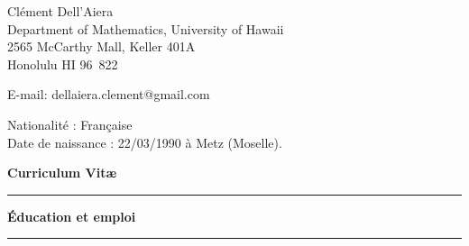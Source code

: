 \documentclass[a4paper,11pt]{article}
\newcommand{\titre}[1]{%
	\begin{center}
	\bigskip
	\rule{\textwidth}{1pt}
	\par\vspace{0.1cm}
        \textbf{\large #1}
	\par\rule{\textwidth}{1pt}
	\end{center}
	\bigskip
	}
\begin{document}
\begin{flushleft}
Clément Dell'Aiera \\
Department of Mathematics, University of Hawaii\\
2565 McCarthy Mall, Keller 401A \\
Honolulu HI 96\ 822 \\

\medskip

E-mail: dellaiera.clement@gmail.com


\end{flushleft}
\begin{flushleft}
Nationalit\'e : Fran\c{c}aise \\
Date de naissance : 22/03/1990 \`{a} Metz (Moselle).
\end{flushleft}

\vspace{1.5cm}
\begin{center}
\par\huge{\textbf{Curriculum Vit\ae} }
\end{center}

\titre{\'{E}ducation et emploi}
\end{document}
